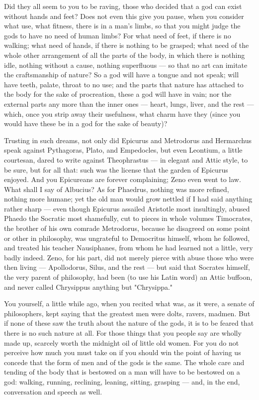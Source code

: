  Did they all seem to you to be raving, those who decided that a god can exist without hands and feet? Does not even this give you pause, when you consider what use, what fitness, there is in a man's limbs, so that you might judge the gods to have no need of human limbs? For what need of feet, if there is no walking; what need of hands, if there is nothing to be grasped; what need of the whole other arrangement of all the parts of the body, in which there is nothing idle, nothing without a cause, nothing superfluous — so that no art can imitate the craftsmanship of nature? So a god will have a tongue and not speak; will have teeth, palate, throat to no use; and the parts that nature has attached to the body for the sake of procreation, these a god will have in vain; nor the external parts any more than the inner ones — heart, lungs, liver, and the rest — which, once you strip away their usefulness, what charm have they (since you would have these be in a god for the sake of beauty)?

 Trusting in such dreams, not only did Epicurus and Metrodorus and Hermarchus speak against Pythagoras, Plato, and Empedocles, but even Leontium, a little courtesan, dared to write against Theophrastus — in elegant and Attic style, to be sure, but for all that: such was the license that the garden of Epicurus enjoyed. And you Epicureans are forever complaining; Zeno even went to law. What shall I say of Albucius? As for Phaedrus, nothing was more refined, nothing more humane; yet the old man would grow nettled if I had said anything rather sharp — even though Epicurus assailed Aristotle most insultingly, abused Phaedo the Socratic most shamefully, cut to pieces in whole volumes Timocrates, the brother of his own comrade Metrodorus, because he disagreed on some point or other in philosophy, was ungrateful to Democritus himself, whom he followed, and treated his teacher Nausiphanes, from whom he had learned not a little, very badly indeed. Zeno, for his part, did not merely pierce with abuse those who were then living — Apollodorus, Silus, and the rest — but said that Socrates himself, the very parent of philosophy, had been (to use his Latin word) an Attic buffoon, and never called Chrysippus anything but "Chrysippa."

 You yourself, a little while ago, when you recited what was, as it were, a senate of philosophers, kept saying that the greatest men were dolts, ravers, madmen. But if none of these saw the truth about the nature of the gods, it is to be feared that there is no such nature at all. For those things that you people say are wholly made up, scarcely worth the midnight oil of little old women. For you do not perceive how much you must take on if you should win the point of having us concede that the form of men and of the gods is the same. The whole care and tending of the body that is bestowed on a man will have to be bestowed on a god: walking, running, reclining, leaning, sitting, grasping — and, in the end, conversation and speech as well.


